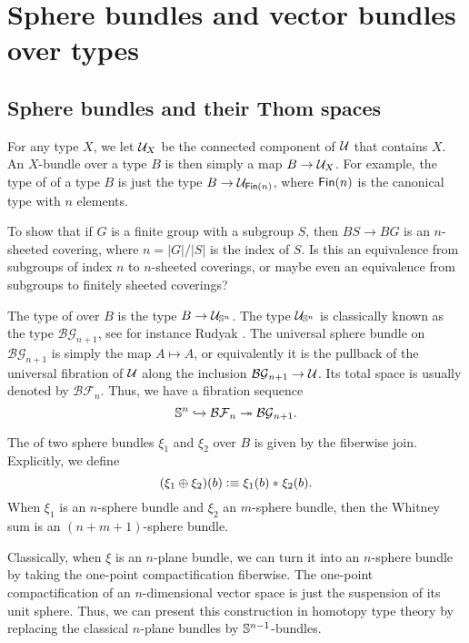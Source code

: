 \documentclass[reqno]{amsart}
\begin{document}
\section{Sphere bundles and vector bundles over types}

\subsection{Sphere bundles and their Thom spaces}\label{sec:sphere_bundles}
For any type $X$, we let $\mathcal{U}_X$ be the connected component of $\mathcal{U}$ that contains
$X$. An $X$-bundle over a type $B$ is then simply a map $B\to\mathcal{U}_X$. For example,
the type of  of a type $B$ is just the type $B\to\mathcal{U}_{\mathsf{Fin}(n)}$,
where $\mathsf{Fin}(n)$ is the canonical type with $n$ elements. 

\begin{proposal}\label{p:finite_subgroups}
To show that if $G$ is a finite group with a subgroup $S$, then $BS\to BG$ is
an $n$-sheeted covering, where $n=|G|/|S|$ is the index of $S$. Is this an
equivalence from subgroups of index $n$ to $n$-sheeted coverings, or maybe even
an equivalence from subgroups to finitely sheeted coverings?
\end{proposal}

The type of
 over $B$ is the type $B\to\mathcal{U}_{\mathbb{S}^{n}}$.
The type $\mathcal{U}_{\mathbb{S}^{n}}$ is classically known as the type $\mathcal{BG}_{n+1}$, see for instance Rudyak \cite{Rudyak98}.
The universal sphere bundle on $\mathcal{BG}_{n+1}$ is simply the map $A\mapsto A$,
or equivalently it is the pullback of the universal fibration of $\mathcal{U}$ along 
the inclusion $\mathcal{BG}_{n+1}\to\mathcal{U}$. Its total space is usually denoted
by $\mathcal{BF}_{n}$. Thus, we have a fibration sequence
\begin{equation*}
\mathbb{S}^{n}\hookrightarrow \mathcal{BF}_n \twoheadrightarrow \mathcal{BG}_{n+1}.
\end{equation*}

The  of two sphere bundles $\xi_1$ and $\xi_2$ over $B$ is given
by the fiberwise join. Explicitly, we define
\begin{equation*}
(\xi_1\oplus\xi_2)(b) \vcentcolon\equiv {\xi_1(b)}\ast_{}{\xi_2(b)}.
\end{equation*}
When $\xi_1$ is an $n$-sphere bundle and $\xi_2$ an $m$-sphere bundle, then
the Whitney sum is an $(n+m+1)$-sphere bundle. 

Classically, when $\xi$ is an $n$-plane bundle, we can turn it into an
$n$-sphere bundle by taking the one-point compactification fiberwise. 
The one-point compactification of an $n$-dimensional vector space is just
the suspension of its unit sphere. Thus, we can present this construction
in homotopy type theory by replacing the classical $n$-plane bundles by
$\mathbb{S}^{n-1}$-bundles. 
\end{document}
